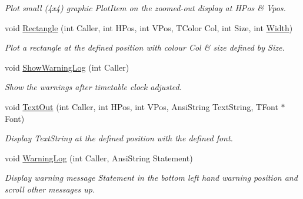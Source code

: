 \begin{DoxyCompactItemize}
\begin{DoxyCompactList}\small\item\em Plot small (4x4) graphic Plot\+Item on the zoomed-\/out display at H\+Pos \& Vpos. \end{DoxyCompactList}\item 
\mbox{\label{class_t_display_a9c7886bf1e4622e8560ad7558ede8dcc}} 
void \mbox{\hyperlink{class_t_display_a9c7886bf1e4622e8560ad7558ede8dcc}{Rectangle}} (int Caller, int H\+Pos, int V\+Pos, T\+Color Col, int Size, int \mbox{\hyperlink{class_t_display_a39cee11613d156de0d1f5df923a02c8d}{Width}})
\begin{DoxyCompactList}\small\item\em Plot a rectangle at the defined position with colour Col \& size defined by Size. \end{DoxyCompactList}\item 
\mbox{\label{class_t_display_aece63da07b7586b62115eeb81c7e2b57}} 
void \mbox{\hyperlink{class_t_display_aece63da07b7586b62115eeb81c7e2b57}{Show\+Warning\+Log}} (int Caller)
\begin{DoxyCompactList}\small\item\em Show the warnings after timetable clock adjusted. \end{DoxyCompactList}\item 
\mbox{\label{class_t_display_adfff17bfef798b07b1e6bbfc6f5e0822}} 
void \mbox{\hyperlink{class_t_display_adfff17bfef798b07b1e6bbfc6f5e0822}{Text\+Out}} (int Caller, int H\+Pos, int V\+Pos, Ansi\+String Text\+String, T\+Font $\ast$Font)
\begin{DoxyCompactList}\small\item\em Display Text\+String at the defined position with the defined font. \end{DoxyCompactList}\item 
\mbox{\label{class_t_display_a604d491a723df459bdcd54a4b9d1d9f2}} 
void \mbox{\hyperlink{class_t_display_a604d491a723df459bdcd54a4b9d1d9f2}{Warning\+Log}} (int Caller, Ansi\+String Statement)
\begin{DoxyCompactList}\small\item\em Display warning message Statement in the bottom left hand warning position and scroll other messages up. \end{DoxyCompactList}\end{DoxyCompactItemize}
